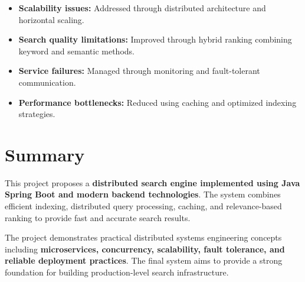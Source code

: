 \documentclass[11pt]{article}
\begin{document}
\begin{itemize}

\item \textbf{Scalability issues:} Addressed through distributed architecture and horizontal scaling.

\item \textbf{Search quality limitations:} Improved through hybrid ranking combining keyword and semantic methods.

\item \textbf{Service failures:} Managed through monitoring and fault-tolerant communication.

\item \textbf{Performance bottlenecks:} Reduced using caching and optimized indexing strategies.

\end{itemize}


\section{Summary}

This project proposes a \textbf{distributed search engine implemented using Java Spring Boot and modern backend technologies}. The system combines efficient indexing, distributed query processing, caching, and relevance-based ranking to provide fast and accurate search results.

The project demonstrates practical distributed systems engineering concepts including \textbf{microservices, concurrency, scalability, fault tolerance, and reliable deployment practices}. The final system aims to provide a strong foundation for building production-level search infrastructure.
\end{document}
